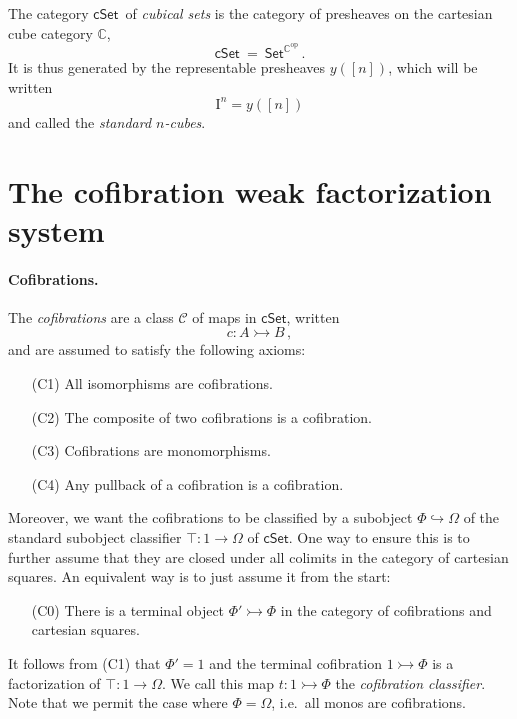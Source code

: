 \documentclass[11pt]{article}
\newcommand{\C}{\ensuremath{\mathbb{C}}}
\newcommand{\psh}[1]{\ensuremath{\mathsf{Set}^{#1^{\mathrm{op}}}}}
\newcommand{\cSet}{\ensuremath{\mathsf{cSet}}}
\newcommand{\hook}{\ensuremath{\hookrightarrow}}
\newcommand{\mono}{\ensuremath{\rightarrowtail}}
\newcommand{\ra}{\ensuremath{\rightarrow}}
\newcommand{\I}{\ensuremath{\mathrm{I}}}
\theoremstyle{remark}
\theoremstyle{definition}
\begin{document}
The category \cSet\ of \emph{cubical sets} is the category of presheaves on the cartesian cube category $\C$,
\[
\mathsf{cSet}\ =\ \psh{\C}\,.
\]
It is thus generated by the representable presheaves $y([n])$, which will be written $$\I^n = y([n])$$
and called the \emph{standard $n$-cubes}.  

\section{The cofibration weak factorization system}\label{sec:cofibrations}

\paragraph{Cofibrations.}
The \emph{cofibrations} are a class $\mathcal{C}$ of maps in $\mathsf{cSet}$, written $$c : A \mono B\,,$$  
and are assumed to satisfy the following axioms:
\begin{enumerate}
\item[(C1)] All isomorphisms are cofibrations.
\item[(C2)] The composite of two cofibrations is a cofibration.
\item[(C3)] Cofibrations are monomorphisms.
\item[(C4)] Any pullback of a cofibration is a cofibration.
\end{enumerate}

Moreover, we want the cofibrations to be classified by a  subobject $\Phi \hook \Omega$ of the standard subobject classifier $\top : 1 \ra \Omega$ of $\mathsf{cSet}$.  One way to ensure this is to further assume that they are closed under all colimits in the category of cartesian squares.  An equivalent way is to just assume it from the start:

\begin{enumerate}
\item[(C0)] There is a terminal object $\Phi' \mono \Phi$ in the category of cofibrations and cartesian squares.
\end{enumerate}

It follows from (C1) that $\Phi' = 1$ and the terminal cofibration $1 \mono \Phi$ is a factorization of $\top : 1 \ra \Omega$.  We call this map $t:1 \mono \Phi$ the \emph{cofibration classifier}.  Note that we permit the case where $\Phi = \Omega$, i.e.\ all monos are cofibrations.
\end{document}
